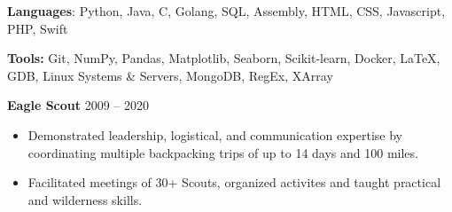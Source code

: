 \documentclass{article}
\begin{document}
    \vspace{2mm}

    

    \noindent \textbf{Languages}: Python, Java, C, Golang, SQL, Assembly, HTML, CSS, Javascript, PHP, Swift
    
    \vspace{2mm}

    \noindent \textbf{Tools:} Git, NumPy, Pandas, Matplotlib, Seaborn, Scikit-learn, Docker, \LaTeX, GDB, Linux Systems \& Servers, MongoDB, RegEx, XArray



    
    \noindent \textbf{Eagle Scout} \hfill 2009 -- 2020
    \begin{itemize}
        \item Demonstrated leadership, logistical, and communication expertise by coordinating multiple backpacking trips of up to 14 days and 100 miles.
        \item Facilitated meetings of 30+ Scouts, organized activites and taught practical and wilderness skills.
    \end{itemize}
    
\end{document}
